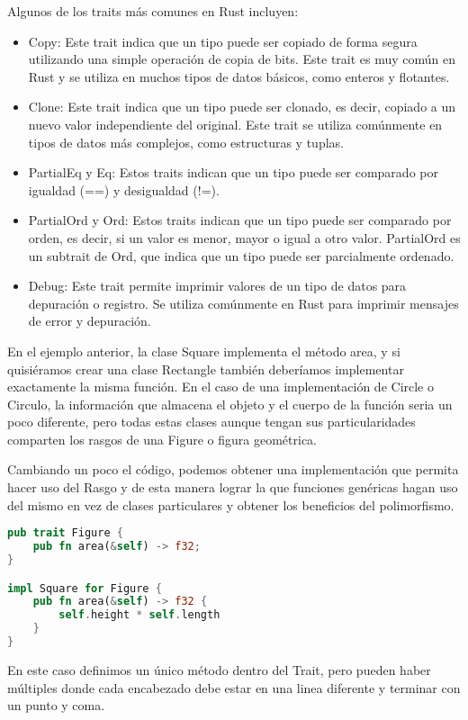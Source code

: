 Algunos de los traits más comunes en Rust incluyen:
\begin{itemize}
    \item Copy: Este trait indica que un tipo puede ser copiado de forma segura utilizando una simple operación de copia de bits. Este trait es muy común en Rust y se utiliza en muchos tipos de datos básicos, como enteros y flotantes.
    \item  Clone: Este trait indica que un tipo puede ser clonado, es decir, copiado a un nuevo valor independiente del original. Este trait se utiliza comúnmente en tipos de datos más complejos, como estructuras y tuplas.
    \item PartialEq y Eq: Estos traits indican que un tipo puede ser comparado por igualdad (==) y desigualdad (!=).
    \item PartialOrd y Ord: Estos traits indican que un tipo puede ser comparado por orden, es decir, si un valor es menor, mayor o igual a otro valor. PartialOrd es un subtrait de Ord, que indica que un tipo puede ser parcialmente ordenado.
    \item Debug: Este trait permite imprimir valores de un tipo de datos para depuración o registro. Se utiliza comúnmente en Rust para imprimir mensajes de error y depuración.
\end{itemize}

En el ejemplo anterior, la clase Square implementa el método area, y si quisiéramos crear una clase Rectangle también deberíamos implementar exactamente la misma función. En el caso de una implementación de Circle o Circulo, la información que almacena el objeto y el cuerpo de la función \textit{} seria un poco diferente, pero todas estas clases aunque tengan sus particularidades comparten los rasgos de una Figure o figura geométrica.

Cambiando un poco el código, podemos obtener una implementación que permita hacer uso del Rasgo y de esta manera lograr la que funciones genéricas hagan uso del mismo en vez de clases particulares y obtener los beneficios del polimorfismo.

\begin{lstlisting}[language=Rust]
pub trait Figure {
    pub fn area(&self) -> f32;
}

impl Square for Figure {
    pub fn area(&self) -> f32 {
        self.height * self.length
    }
}
\end{lstlisting}

En este caso definimos un único método dentro del Trait, pero pueden haber múltiples donde cada encabezado debe estar en una linea diferente y terminar con un punto y coma.

